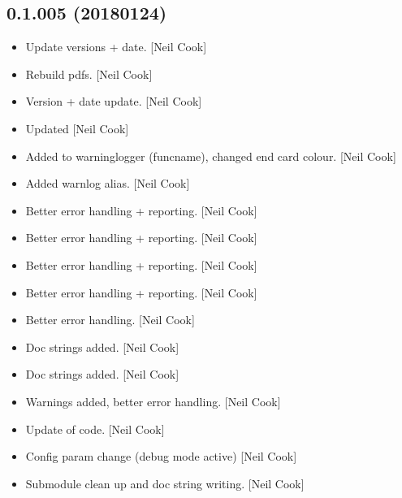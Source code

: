 \documentclass[a4paper,10pt,english]{report}
\begin{document}
\subsection{0.1.005 (2018\sphinxhyphen{}01\sphinxhyphen{}24)}
\label{\detokenize{misc/changelog:id518}}\begin{itemize}
\item {} 
Update versions + date. {[}Neil Cook{]}

\item {} 
Rebuild pdfs. {[}Neil Cook{]}

\item {} 
Version + date update. {[}Neil Cook{]}

\item {} 
Updated  {[}Neil Cook{]}

\item {} 
Added to warninglogger (funcname), changed end card colour. {[}Neil
Cook{]}

\item {} 
Added warnlog alias. {[}Neil Cook{]}

\item {} 
Better error handling + reporting. {[}Neil Cook{]}

\item {} 
Better error handling + reporting. {[}Neil Cook{]}

\item {} 
Better error handling + reporting. {[}Neil Cook{]}

\item {} 
Better error handling + reporting. {[}Neil Cook{]}

\item {} 
Better error handling. {[}Neil Cook{]}

\item {} 
Doc strings added. {[}Neil Cook{]}

\item {} 
Doc strings added. {[}Neil Cook{]}

\item {} 
Warnings added, better error handling. {[}Neil Cook{]}

\item {} 
Update of code. {[}Neil Cook{]}

\item {} 
Config param change (debug mode active) {[}Neil Cook{]}

\item {} 
Submodule clean up and doc string writing. {[}Neil Cook{]}


\end{itemize}
\end{document}
